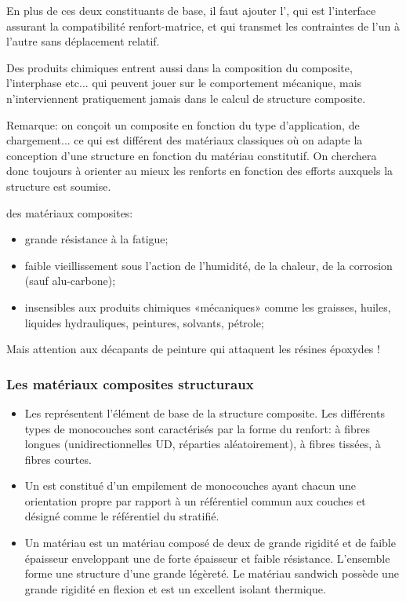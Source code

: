 \medskip
En plus de ces deux constituants de base, il faut ajouter l', qui est l'interface assurant la compatibilité renfort-matrice, et qui transmet les contraintes de l'un à l'autre sans  déplacement relatif.

\medskip
Des produits chimiques entrent aussi dans la composition du composite, l'interphase etc... qui peuvent jouer sur le comportement mécanique, mais n'interviennent pratiquement jamais dans le calcul de structure composite.

\medskip
{} Remarque: on conçoit un composite en fonction du type d'application, de chargement... ce qui est différent des matériaux classiques où on adapte la conception d'une structure en fonction du matériau constitutif. On cherchera donc toujours à orienter au mieux les renforts en fonction des efforts auxquels la structure est soumise.

\medskip
{} des matériaux composites:
\begin{itemize}
	\item grande résistance à la fatigue;
	\item faible vieillissement sous l'action de l'humidité, de la chaleur, de la corrosion (sauf alu-carbone);
	\item insensibles aux produits chimiques «mécaniques» comme les graisses, huiles, liquides hydrauliques, peintures, solvants, pétrole;
\end{itemize}
Mais attention aux décapants de peinture qui attaquent les résines époxydes !


\medskip
\subsubsection{Les matériaux composites structuraux}

\begin{itemize}
	\item Les  représentent l'élément de base de la structure composite. Les différents types de monocouches sont caractérisés par la forme du renfort:
		 à fibres longues (unidirectionnelles UD, réparties aléatoirement), à fibres tissées, à fibres courtes.
	\item Un  est constitué d'un empilement de monocouches ayant chacun une orientation propre par rapport à un référentiel commun aux couches et désigné comme le référentiel du stratifié.
	\item Un matériau  est un matériau composé de deux  de grande rigidité et de faible épaisseur enveloppant une  de forte épaisseur et faible résistance.
		L'ensemble forme une structure d'une grande légèreté.
		Le matériau sandwich possède une grande rigidité en flexion et est un excellent isolant thermique.
\end{itemize}

